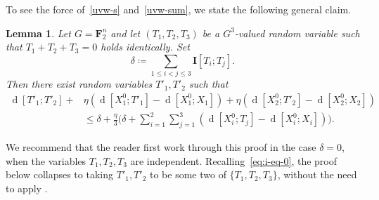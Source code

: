 \documentclass[12pt,reqno,tbtags]{amsart}
\newtheorem{lemma}[theorem]{Lemma}
\theoremstyle{definition}
\theoremstyle{remark}
\renewcommand{\leq}{\leqslant}
\def\F{\mathbf{F}}
\newcommand{\I}[1]{\mathbf{I}[#1]}
\newcommand{\dist}[2]{{\operatorname{d}[#1;#2]}} %
\numberwithin{equation}{section}
\begin{document}
To see the force of~\eqref{uvw-s} and~\eqref{uvw-sum}, we state the following general claim.
\begin{lemma}%
  \label{lem:abstract}
  Let $G=\F_2^n$ and let $(T_1,T_2,T_3)$ be a $G^3$-valued random variable such that $T_1+T_2+T_3=0$ holds identically. Set
  \begin{equation}\label{delta-t1t2t3-def}
    \delta \coloneqq \sum_{1 \leq i < j \leq 3} \I{T_i;T_j}.
  \end{equation}
  Then there exist random variables $T'_1, T'_2$ such that
  \begin{align*}  \dist{T'_1}{T'_2} + & \eta (\dist{X_1^0}{T'_1} - \dist{X_1^0}{X_1}) + \eta(\dist{X_2^0}{T'_2} - \dist{X_2^0}{X_2}) \\ & \leq  \delta + \frac{\eta}{3} \biggl( \delta + \sum_{i=1}^2 \sum_{j = 1}^3 (\dist{X^0_i}{T_j} - \dist{X^0_i}{X_i}) \biggr).
  \end{align*}
\end{lemma}

We recommend that the reader first work through this proof in the case $\delta = 0$, when the variables $T_1, T_2, T_3$ are independent.  Recalling~\eqref{eq:i-eq-0}, the proof below collapses to taking $T'_1,T'_2$ to be some two of $\{T_1,T_2,T_3\}$, without the need to apply .
\end{document}
